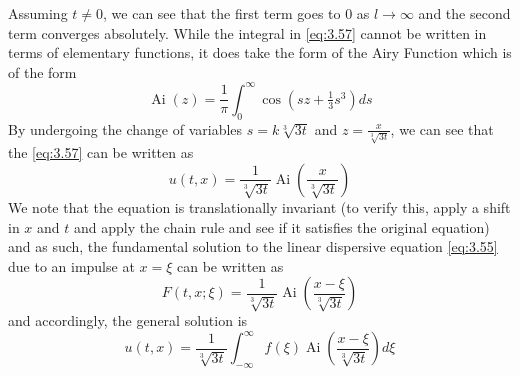 \documentclass{article}
\numberwithin{equation}{section}
\begin{document}
Assuming $t\neq 0$, we can see that the first term goes to 0 as $l\rightarrow \infty$ and the second term converges absolutely. While the integral in \eqref{eq:3.57} cannot be written in terms of elementary functions, it does take the form of the Airy Function which is of the form
\begin{equation*}
    \operatorname{Ai} (z) = \frac{1}{\pi}\int^\infty_0 \cos(sz+\tfrac{1}{3}s^3)ds
\end{equation*}
By undergoing the change of variables $s=k\sqrt[3]{3t}$ and $z=\frac{x}{\sqrt[3]{3t}}$, we can see that the \eqref{eq:3.57} can be written as 
\begin{equation*}
    u(t,x) = \frac{1}{\sqrt[3]{3t}} \operatorname{Ai}\left( \frac{x}{\sqrt[3]{3t}} \right)
\end{equation*}
We note that the equation is translationally invariant (to verify this, apply a shift in $x$ and $t$ and apply the chain rule and see if it satisfies the original equation) and as such, the fundamental solution to the linear dispersive equation \eqref{eq:3.55} due to an impulse at $x=\xi$ can be written as 
\begin{equation*}
    F(t,x;\xi)=\frac{1}{\sqrt[3]{3t}} \operatorname{Ai}\left( \frac{x-\xi}{\sqrt[3]{3t}} \right)
\end{equation*}
and accordingly, the general solution is 
\begin{equation}
    u(t,x) =\frac{1}{\sqrt[3]{3t}} \int^\infty_{-\infty} f(\xi)\operatorname{Ai}\left( \frac{x-\xi}{\sqrt[3]{3t}} \right) d\xi
\end{equation}
\end{document}

